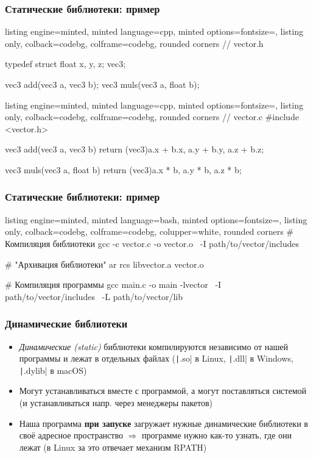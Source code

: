 \documentclass[10pt]{beamer}
\begin{document}
\begin{frame}[fragile]
\frametitle{Статические библиотеки: пример}
\begin{tcblisting}{listing engine=minted, minted language=cpp, minted options={fontsize=\scriptsize}, listing only, colback=codebg, colframe=codebg, rounded corners}
// vector.h

typedef struct {
  float x, y, z;
} vec3;

vec3 add(vec3 a, vec3 b);
vec3 muls(vec3 a, float b);
\end{tcblisting}
\begin{tcblisting}{listing engine=minted, minted language=cpp, minted options={fontsize=\scriptsize}, listing only, colback=codebg, colframe=codebg, rounded corners}
// vector.c
#include <vector.h>

vec3 add(vec3 a, vec3 b) {
  return (vec3){a.x + b.x, a.y + b.y, a.z + b.z};
}

vec3 muls(vec3 a, float b) {
  return (vec3){a.x * b, a.y * b, a.z * b};
}
\end{tcblisting}
\end{frame}

\begin{frame}[fragile]
\frametitle{Статические библиотеки: пример}
\begin{tcblisting}{listing engine=minted, minted language=bash, minted options={fontsize=\scriptsize}, listing only, colback=codebg, colframe=codebg, colupper=white, rounded corners}
# Компиляция библиотеки
gcc -c vector.c -o vector.o \
  -I path/to/vector/includes

# "Архивация библиотеки"
ar rcs libvector.a vector.o

# Компиляция программы
gcc main.c -o main -lvector \
  -I path/to/vector/includes \
  -L path/to/vector/lib
\end{tcblisting}
\end{frame}

\begin{frame}[fragile]
\frametitle{Динамические библиотеки}
\begin{itemize}
\item \textit{Динамические (static)} библиотеки компилируются независимо от нашей программы и лежат в отдельных файлах (\texttt|.so| в Linux, \texttt|.dll| в Windows, \texttt|.dylib| в macOS)
\pause
\item Могут устанавливаться вместе с программой, а могут поставляться системой (и устанавливаться напр. через менеджеры пакетов)
\pause
\item Наша программа \textbf{при запуске} загружает нужные динамические библиотеки в своё адресное пространство \(\Longrightarrow\) программе нужно как-то узнать, где они лежат (в Linux за это отвечает механизм RPATH)
\end{itemize}
\end{frame}
\end{document}
